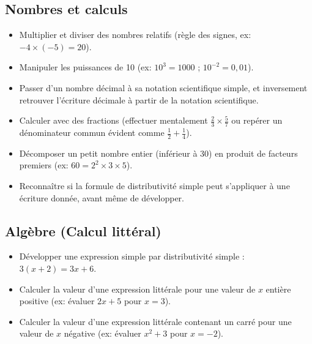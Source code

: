 \documentclass[11pt,a4paper]{article}
\begin{document}
\subsection*{Nombres et calculs}
\begin{itemize}[label=,leftmargin=*]
    \item Multiplier et diviser des nombres relatifs (règle des signes, ex: $-4 \times (-5) = 20$).
    \item Manipuler les puissances de 10 (ex: $10^3 = 1000$ ; $10^{-2} = 0,01$).
    \item Passer d'un nombre décimal à sa notation scientifique simple, et inversement retrouver l'écriture décimale à partir de la notation scientifique.
    \item Calculer avec des fractions (effectuer mentalement $\frac{2}{3} \times \frac{5}{7}$ ou repérer un dénominateur commun évident comme $\frac{1}{2} + \frac{1}{4}$).
    \item Décomposer un petit nombre entier (inférieur à 30) en produit de facteurs premiers (ex: $60 = 2^2 \times 3 \times 5$).
    \item Reconnaître si la formule de distributivité simple peut s'appliquer à une écriture donnée, avant même de développer.
\end{itemize}

\subsection*{Algèbre (Calcul littéral)}
\begin{itemize}[label=,leftmargin=*]
    \item Développer une expression simple par distributivité simple : $3(x + 2) = 3x + 6$.
    \item Calculer la valeur d'une expression littérale pour une valeur de $x$ entière positive (ex: évaluer $2x + 5$ pour $x = 3$).
    \item Calculer la valeur d'une expression littérale contenant un carré pour une valeur de $x$ négative (ex: évaluer $x^2 + 3$ pour $x = -2$).
\end{itemize}
\end{document}
